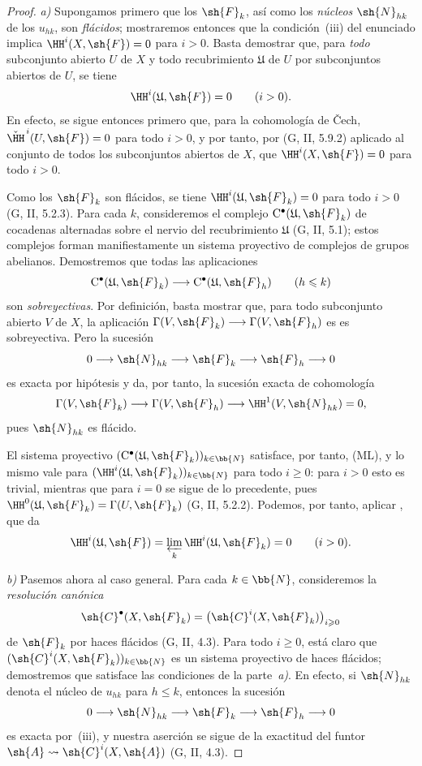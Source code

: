 \documentclass[oneside]{amsart}
\renewcommand{\leq}{\leqslant}
\renewcommand{\geq}{\geqslant}
\newcommand{\oldpage}[2][]{{\marginnote{\normalfont\textbf{#1}~|~#2}}\ignorespaces}
\begin{document}
\begin{proof}
\emph{a)}
Supongamos primero que los $\sh{F}_k$, así como los \emph{núcleos}
$\sh{N}_{hk}$ de los $u_{hk}$, son \emph{flácidos}; mostraremos entonces que
la condición~{\rm(iii)} del enunciado implica
$\HH^i(X,\sh{F})=0$ para $i>0$.
Basta demostrar que, para \emph{todo} subconjunto abierto $U$ de $X$ y todo
recubrimiento $\mathfrak{U}$ de $U$ por subconjuntos abiertos de $U$, se tiene
\[
  \HH^i(\mathfrak{U},\sh{F})=0
  \qquad (i>0).
\]
En efecto, se sigue entonces primero que, para la cohomología de \v{C}ech,
$\check{\HH}^{\,i}(U,\sh{F})=0$ para todo $i>0$, y por tanto, por
(G, II, 5.9.2) aplicado al conjunto de todos los subconjuntos abiertos de
$X$, que $\HH^i(X,\sh{F})=0$ para todo $i>0$.

Como los $\sh{F}_k$ son flácidos, se tiene
$\HH^i(\mathfrak{U},\sh{F}_k)=0$ para todo $i>0$
(G, II, 5.2.3).
Para cada $k$, consideremos el complejo
$\mathrm{C}^\bullet(\mathfrak{U},\sh{F}_k)$ de cocadenas
alternadas sobre el nervio del recubrimiento $\mathfrak{U}$ (G, II, 5.1);
estos complejos forman manifiestamente un sistema proyectivo de complejos de
grupos abelianos.
Demostremos que todas las aplicaciones
\[
  \mathrm{C}^\bullet(\mathfrak{U},\sh{F}_k)
  \longrightarrow
  \mathrm{C}^\bullet(\mathfrak{U},\sh{F}_h)
  \qquad(h\leq k)
\]
son \emph{sobreyectivas}.
Por definición, basta mostrar que, para todo subconjunto abierto $V$
de $X$, la aplicación
$\Gamma(V,\sh{F}_k)\longrightarrow\Gamma(V,\sh{F}_h)$ es
es sobreyectiva. Pero la sucesión
\[
  0\longrightarrow\sh{N}_{hk}\longrightarrow\sh{F}_k
  \longrightarrow\sh{F}_h\longrightarrow0
\]
es exacta por hipótesis y da, por tanto, la sucesión exacta de
cohomología
\[
  \Gamma(V,\sh{F}_k)\longrightarrow\Gamma(V,\sh{F}_h)
  \longrightarrow\HH^1(V,\sh{N}_{hk})=0,
\]
pues $\sh{N}_{hk}$ es flácido.

El sistema proyectivo
$(\mathrm{C}^\bullet(\mathfrak{U},\sh{F}_k))_{k\in\bb{N}}$
satisface, por tanto, (ML), y lo mismo vale para
$(\HH^i(\mathfrak{U},\sh{F}_k))_{k\in\bb{N}}$ para todo $i\geq0$:
para $i>0$ esto es trivial, mientras que para $i=0$ se sigue de lo
precedente, pues
$\HH^0(\mathfrak{U},\sh{F}_k)=\Gamma(U,\sh{F}_k)$
(G, II, 5.2.2).
Podemos, por tanto, aplicar , que da
\[
  \HH^i(\mathfrak{U},\sh{F})
  =
  \varprojlim_k\HH^i(\mathfrak{U},\sh{F}_k)
  =0
  \qquad(i>0).
\]

\emph{b)}
Pasemos ahora al caso general. Para cada $k\in\bb{N}$, consideremos la
\emph{resolución canónica}
\[
  \sh{C}^\bullet(X,\sh{F}_k)
  =
  \bigl(\sh{C}^i(X,\sh{F}_k)\bigr)_{i\geq0}
\]
de $\sh{F}_k$ por haces flácidos (G, II, 4.3).
Para todo $i\geq0$, está claro que
$(\sh{C}^i(X,\sh{F}_k))_{k\in\bb{N}}$ es un sistema proyectivo de
haces flácidos; demostremos que satisface las condiciones de la
parte~\emph{a)}.
\oldpage[0\textsubscript{III}]{69}
En efecto, si $\sh{N}_{hk}$ denota el núcleo de $u_{hk}$ para $h\leq k$,
entonces la sucesión
\[
  0\longrightarrow\sh{N}_{hk}\longrightarrow\sh{F}_k
  \longrightarrow\sh{F}_h\longrightarrow0
\]
es exacta por~{\rm(iii)}, y nuestra aserción se sigue de la exactitud
del funtor
$\sh{A}\leadsto\sh{C}^i(X,\sh{A})$ (G, II, 4.3).


\end{proof}
\end{document}
